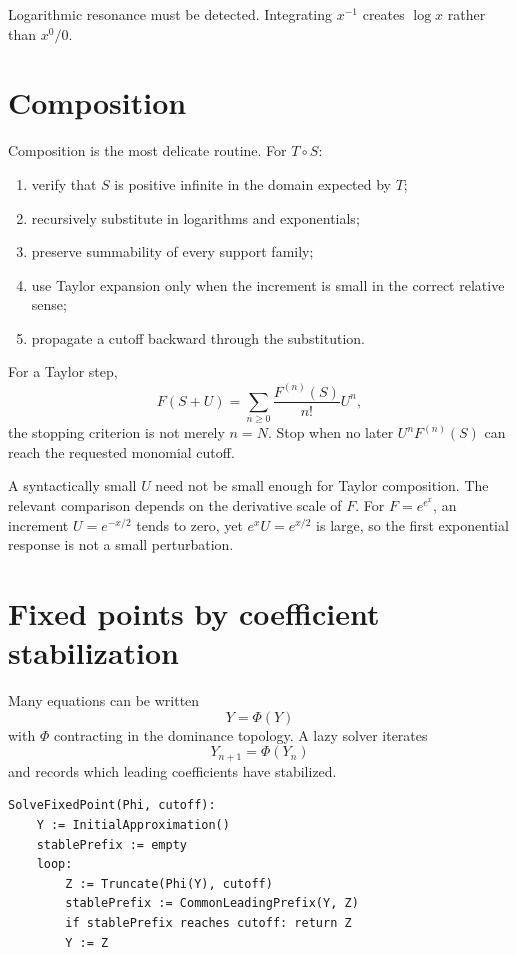 \documentclass[11pt,openany]{book}
\theoremstyle{definition}
\theoremstyle{plain}
\theoremstyle{remark}
\begin{document}
Logarithmic resonance must be detected. Integrating $x^{-1}$ creates $\log x$ rather than $x^0/0$.

\section{Composition}

Composition is the most delicate routine. For $T\circ S$:
\begin{enumerate}
 \item verify that $S$ is positive infinite in the domain expected by $T$;
 \item recursively substitute in logarithms and exponentials;
 \item preserve summability of every support family;
 \item use Taylor expansion only when the increment is small in the correct relative sense;
 \item propagate a cutoff backward through the substitution.
\end{enumerate}

For a Taylor step,
\[
 F(S+U)=\sum_{n\ge0}\frac{F^{(n)}(S)}{n!}U^n,
\]
the stopping criterion is not merely $n=N$. Stop when no later $U^nF^{(n)}(S)$ can reach the requested monomial cutoff.

\begin{warningbox}
A syntactically small $U$ need not be small enough for Taylor composition. The relevant comparison depends on the derivative scale of $F$. For $F=e^{e^x}$, an increment $U=e^{-x/2}$ tends to zero, yet $e^xU=e^{x/2}$ is large, so the first exponential response is not a small perturbation.
\end{warningbox}

\section{Fixed points by coefficient stabilization}

Many equations can be written
\[
 Y=\Phi(Y)
\]
with $\Phi$ contracting in the dominance topology. A lazy solver iterates
\[
 Y_{n+1}=\Phi(Y_n)
\]
and records which leading coefficients have stabilized.

\begin{lstlisting}[style=pseudo]
SolveFixedPoint(Phi, cutoff):
    Y := InitialApproximation()
    stablePrefix := empty
    loop:
        Z := Truncate(Phi(Y), cutoff)
        stablePrefix := CommonLeadingPrefix(Y, Z)
        if stablePrefix reaches cutoff: return Z
        Y := Z
\end{lstlisting}
\end{document}
